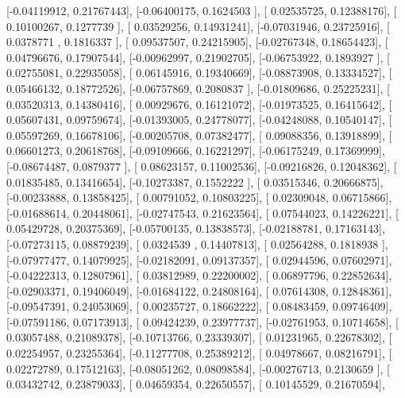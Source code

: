 \documentclass{article}
\begin{document}
       [-0.04119912,  0.21767443],
       [-0.06400175,  0.1624503 ],
       [ 0.02535725,  0.12388176],
       [ 0.10100267,  0.1277739 ],
       [ 0.03529256,  0.14931241],
       [-0.07031946,  0.23725916],
       [ 0.0378771 ,  0.1816337 ],
       [ 0.09537507,  0.24215905],
       [-0.02767348,  0.18654423],
       [ 0.04796676,  0.17907544],
       [-0.00962997,  0.21902705],
       [-0.06753922,  0.1893927 ],
       [ 0.02755081,  0.22935058],
       [ 0.06145916,  0.19340669],
       [-0.08873908,  0.13334527],
       [ 0.05466132,  0.18772526],
       [-0.06757869,  0.2080837 ],
       [-0.01809686,  0.25225231],
       [ 0.03520313,  0.14380416],
       [ 0.00929676,  0.16121072],
       [-0.01973525,  0.16415642],
       [ 0.05607431,  0.09759674],
       [-0.01393005,  0.24778077],
       [-0.04248088,  0.10540147],
       [ 0.05597269,  0.16678106],
       [-0.00205708,  0.07382477],
       [ 0.09088356,  0.13918899],
       [ 0.06601273,  0.20618768],
       [-0.09109666,  0.16221297],
       [-0.06175249,  0.17369999],
       [-0.08674487,  0.0879377 ],
       [ 0.08623157,  0.11002536],
       [-0.09216826,  0.12048362],
       [ 0.01835485,  0.13416654],
       [-0.10273387,  0.1552222 ],
       [ 0.03515346,  0.20666875],
       [-0.00233888,  0.13858425],
       [ 0.00791052,  0.10803225],
       [ 0.02309048,  0.06715866],
       [-0.01688614,  0.20448061],
       [-0.02747543,  0.21623564],
       [ 0.07544023,  0.14226221],
       [ 0.05429728,  0.20375369],
       [-0.05700135,  0.13838573],
       [-0.02188781,  0.17163143],
       [-0.07273115,  0.08879239],
       [ 0.0324539 ,  0.14407813],
       [ 0.02564288,  0.1818938 ],
       [-0.07977477,  0.14079925],
       [-0.02182091,  0.09137357],
       [ 0.02944596,  0.07602971],
       [-0.04222313,  0.12807961],
       [ 0.03812989,  0.22200002],
       [ 0.06897796,  0.22852634],
       [-0.02903371,  0.19406049],
       [-0.01684122,  0.24808164],
       [ 0.07614308,  0.12848361],
       [-0.09547391,  0.24053069],
       [ 0.00235727,  0.18662222],
       [ 0.08483459,  0.09746409],
       [-0.07591186,  0.07173913],
       [ 0.09424239,  0.23977737],
       [-0.02761953,  0.10714658],
       [ 0.03057488,  0.21089378],
       [-0.10713766,  0.23339307],
       [ 0.01231965,  0.22678302],
       [ 0.02254957,  0.23255364],
       [-0.11277708,  0.25389212],
       [ 0.04978667,  0.08216791],
       [ 0.02272789,  0.17512163],
       [-0.08051262,  0.08098584],
       [-0.00276713,  0.2130659 ],
       [ 0.03432742,  0.23879033],
       [ 0.04659354,  0.22650557],
       [ 0.10145529,  0.21670594],
\end{document}
